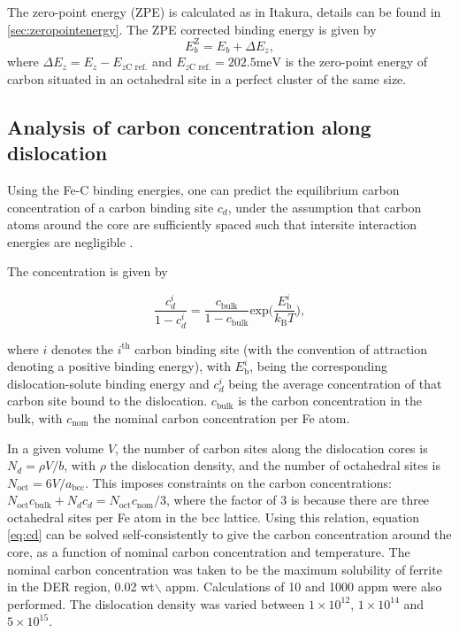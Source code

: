 \documentclass[a4paper,11pt]{article}
\begin{document}
The zero-point energy (ZPE) is calculated as in Itakura, details can be found in \ref{sec:zeropointenergy}. 
The ZPE corrected binding energy is given by 
\[ E^{\text{Z}}_{b} = E_b + \Delta E_z,  \]
where \(\Delta E_z = E_z - E_{z\text{C ref.}}\) and \(E_{z\text{C ref.}} = 202.5 \text{meV}\) is the zero-point energy of carbon
situated in an octahedral site in a perfect cluster of the same size. 

\subsection{Analysis of carbon concentration along dislocation}
\label{sec:org6d0afbf}

Using the Fe-C binding energies, one can predict the equilibrium carbon concentration of a carbon
binding site \(c_d\), under the assumption that carbon atoms around the core are sufficiently spaced such that intersite
interaction energies are negligible \cite{Ventelon2015}.

The concentration is given by 

\begin{equation}
\frac{ c_d^{i} }{1 -  c_d^{i} } = \frac{ c_{\text{bulk}}^{} }{1 - c_{\text{bulk}} } \text{exp} \Big( 
\frac{E_{\text{b}}^i}{k_{\text{B}}T}  \Big),    \label{eq:cd}
\end{equation}


where \(i\) denotes the \(i^{\text{th}}\) carbon binding site (with the convention of attraction
denoting a positive binding energy), with \(E_{\text{b}}^{i}\), being the
corresponding dislocation-solute binding energy and \(c_d^{i}\) being the average concentration of that carbon
site bound to the dislocation. \(c_{\text{bulk}}^{}\) is the carbon concentration in the bulk, with
\(c_{\text{nom}}^{}\) the nominal carbon concentration per Fe atom.


In a given volume \(V\), the number of carbon sites along the dislocation cores is \(N_d = \rho V/b\),
with \(\rho\) the dislocation density, and the number of octahedral sites is \(N_{\text{oct}} =
    6V/a_{\text{bcc}}\). This imposes constraints on the carbon concentrations: \(N_{\text{oct}}
    c_{\text{bulk}}^{} + N_d c_d = N_{\text{oct}} c_{\text{nom}}/3\), where the factor of 3 is because there are
three octahedral sites per Fe atom in the bcc lattice. Using this relation, equation \ref{eq:cd}
can be solved self-consistently to give the carbon concentration around the core, as a
function of nominal carbon concentration and temperature. The nominal carbon concentration was
taken to be the maximum solubility of ferrite in the DER region, 0.02 wt$\backslash$%
appm. Calculations of 10 and 1000 appm were also performed. The dislocation density was varied
between \(1\times10^{12}\), \(1\times10^{14}\) and \(5\times10^{15}\).
\end{document}
